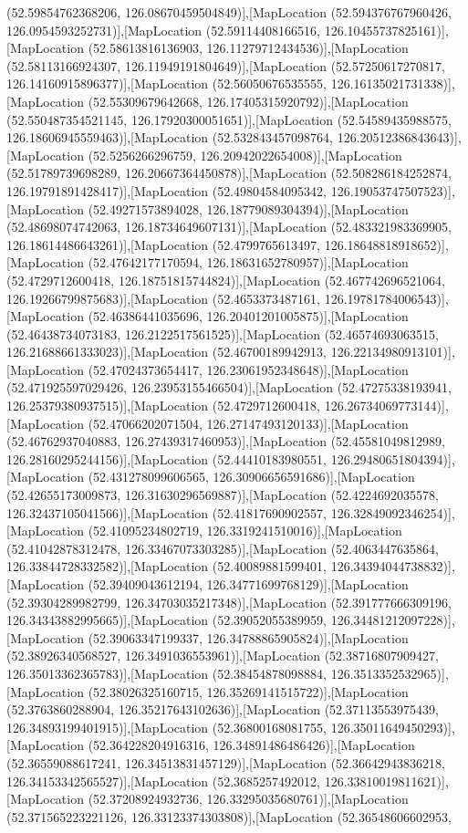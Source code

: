 (52.59854762368206, 126.08670459504849)],[MapLocation (52.594376767960426, 126.0954593252731)],[MapLocation (52.59114408166516, 126.10455737825161)],[MapLocation (52.58613816136903, 126.11279712434536)],[MapLocation (52.58113166924307, 126.11949191804649)],[MapLocation (52.57250617270817, 126.14160915896377)],[MapLocation (52.56050676535555, 126.16135021731338)],[MapLocation (52.55309679642668, 126.17405315920792)],[MapLocation (52.550487354521145, 126.17920300051651)],[MapLocation (52.54589435988575, 126.18606945559463)],[MapLocation (52.532843457098764, 126.20512386843643)],[MapLocation (52.5256266296759, 126.20942022654008)],[MapLocation (52.51789739698289, 126.20667364450878)],[MapLocation (52.508286184252874, 126.19791891428417)],[MapLocation (52.49804584095342, 126.19053747507523)],[MapLocation (52.49271573894028, 126.18779089304394)],[MapLocation (52.48698074742063, 126.18734649607131)],[MapLocation (52.483321983369905, 126.18614486643261)],[MapLocation (52.4799765613497, 126.18648818918652)],[MapLocation (52.47642177170594, 126.18631652780957)],[MapLocation (52.4729712600418, 126.18751815744824)],[MapLocation (52.467742696521064, 126.19266799875683)],[MapLocation (52.4653373487161, 126.19781784006543)],[MapLocation (52.46386441035696, 126.20401201005875)],[MapLocation (52.46438734073183, 126.2122517561525)],[MapLocation (52.46574693063515, 126.21688661333023)],[MapLocation (52.46700189942913, 126.22134980913101)],[MapLocation (52.47024373654417, 126.23061952348648)],[MapLocation (52.471925597029426, 126.23953155466504)],[MapLocation (52.47275338193941, 126.25379380937515)],[MapLocation (52.4729712600418, 126.26734069773144)],[MapLocation (52.47066202071504, 126.27147493120133)],[MapLocation (52.46762937040883, 126.27439317460953)],[MapLocation (52.45581049812989, 126.28160295244156)],[MapLocation (52.44410183980551, 126.29480651804394)],[MapLocation (52.431278099606565, 126.30906656591686)],[MapLocation (52.42655173009873, 126.31630296569887)],[MapLocation (52.4224692035578, 126.32437105041566)],[MapLocation (52.41817690902557, 126.32849092346254)],[MapLocation (52.41095234802719, 126.3319241510016)],[MapLocation (52.41042878312478, 126.33467073303285)],[MapLocation (52.4063447635864, 126.33844728332582)],[MapLocation (52.40089881599401, 126.34394044738832)],[MapLocation (52.39409043612194, 126.34771699768129)],[MapLocation (52.39304289982799, 126.34703035217348)],[MapLocation (52.391777666309196, 126.34343882995665)],[MapLocation (52.39052055389959, 126.34481212097228)],[MapLocation (52.39063347199337, 126.34788865905824)],[MapLocation (52.38926340568527, 126.3491036553961)],[MapLocation (52.38716807909427, 126.35013362365783)],[MapLocation (52.38454878098884, 126.3513352532965)],[MapLocation (52.38026325160715, 126.35269141515722)],[MapLocation (52.3763860288904, 126.35217643102636)],[MapLocation (52.37113553975439, 126.34893199401915)],[MapLocation (52.36800168081755, 126.35011649450293)],[MapLocation (52.364228204916316, 126.34891486486426)],[MapLocation (52.36559088617241, 126.34513831457129)],[MapLocation (52.36642943836218, 126.34153342565527)],[MapLocation (52.3685257492012, 126.33810019811621)],[MapLocation (52.37208924932736, 126.33295035680761)],[MapLocation (52.371565223221126, 126.33123374303808)],[MapLocation (52.36548606602953, 